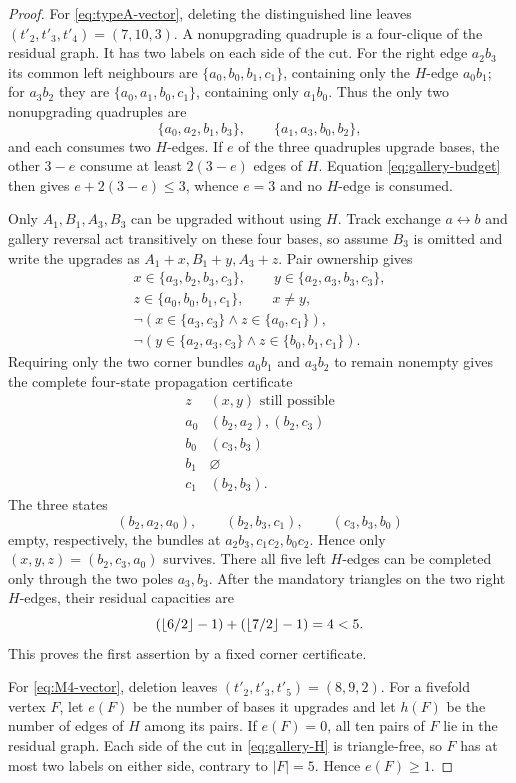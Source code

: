 \begin{proof}
For \eqref{eq:typeA-vector}, deleting the distinguished line leaves
$(t'_2,t'_3,t'_4)=(7,10,3)$.  A nonupgrading quadruple is a four-clique of
the residual graph.  It has two labels on each side of the cut.  For the
right edge $a_2b_3$ its common left neighbours are
$\{a_0,b_0,b_1,c_1\}$, containing only the $H$-edge $a_0b_1$; for
$a_3b_2$ they are $\{a_0,a_1,b_0,c_1\}$, containing only $a_1b_0$.
Thus the only two nonupgrading quadruples are
\[
 \{a_0,a_2,b_1,b_3\},\qquad
 \{a_1,a_3,b_0,b_2\},
\]
and each consumes two $H$-edges.  If $e$ of the three quadruples upgrade
bases, the other $3-e$ consume at least $2(3-e)$ edges of $H$.
Equation \eqref{eq:gallery-budget} then gives
$e+2(3-e)\le3$, whence $e=3$ and no $H$-edge is consumed.

Only $A_1,B_1,A_3,B_3$ can be upgraded without using $H$.  Track exchange
$a\leftrightarrow b$ and gallery reversal act transitively on these four
bases, so assume $B_3$ is omitted and write the upgrades as
$A_1+x,B_1+y,A_3+z$.  Pair ownership gives
\[
 \begin{gathered}
 x\in\{a_3,b_2,b_3,c_3\},\qquad
 y\in\{a_2,a_3,b_3,c_3\},\\
 z\in\{a_0,b_0,b_1,c_1\},\qquad x\ne y,\\
 \neg(x\in\{a_3,c_3\}\land z\in\{a_0,c_1\}),\\
 \neg(y\in\{a_2,a_3,c_3\}\land z\in\{b_0,b_1,c_1\}).
 \end{gathered}
\]
Requiring only the two corner bundles $a_0b_1$ and $a_3b_2$ to remain
nonempty gives the complete four-state propagation certificate
\[
\begin{array}{c|c}
z& (x,y)\text{ still possible}\\ \hline
a_0&(b_2,a_2),(b_2,c_3)\\
b_0&(c_3,b_3)\\
b_1&\varnothing\\
c_1&(b_2,b_3).
\end{array}
\]
The three states
\[
 (b_2,a_2,a_0),\qquad (b_2,b_3,c_1),\qquad(c_3,b_3,b_0)
\]
empty, respectively, the bundles at $a_2b_3,c_1c_2,b_0c_2$.  Hence only
$(x,y,z)=(b_2,c_3,a_0)$ survives.  There all five left $H$-edges can be
completed only through the two poles $a_3,b_3$.  After the mandatory
triangles on the two right $H$-edges, their residual capacities are
\[
 (\left\lfloor 6/2\right\rfloor-1)+(\left\lfloor 7/2\right\rfloor-1)=4<5.
\]
This proves the first assertion by a fixed corner certificate.

For \eqref{eq:M4-vector}, deletion leaves
$(t'_2,t'_3,t'_5)=(8,9,2)$.  For a fivefold vertex $F$, let $e(F)$ be the
number of bases it upgrades and let $h(F)$ be the number of edges of $H$
among its pairs.  If $e(F)=0$, all ten pairs of $F$ lie in the residual
graph.  Each side of the cut in \eqref{eq:gallery-H} is triangle-free, so
$F$ has at most two labels on either side, contrary to $|F|=5$.  Hence
$e(F)\ge1$.


\end{proof}
